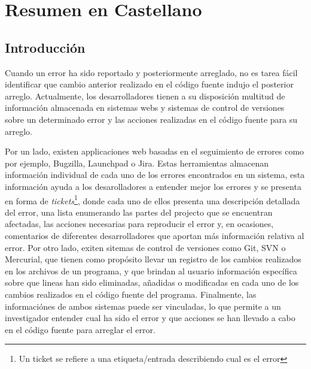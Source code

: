 \documentclass[a4paper, 12pt]{book}
\begin{document}

\cleardoublepage
\chapter{Resumen en Castellano}
\label{app:resumen}
\section{Introducci\'on}

Cuando un error ha sido reportado y posteriormente arreglado, no es tarea f\'acil identificar que cambio anterior realizado en el c\'odigo fuente indujo el posterior arreglo. Actualmente, los desarrolladores tienen a su disposici\'on multitud de informaci\'on almacenada en sistemas webs y sistemas de control de versiones sobre un determinado error y las acciones realizadas en el c\'odigo fuente para su arreglo.

Por un lado, existen applicaciones web basadas en el seguimiento de errores como por ejemplo, Bugzilla, Launchpad o Jira. Estas herramientas almacenan informaci\'on individual de cada uno de los errores encontrados en un sistema, esta informaci\'on ayuda a los desarolladores a entender mejor los errores y se presenta en forma de \emph{tickets}\footnote{Un ticket se refiere a una etiqueta/entrada describiendo cual es el error}, donde cada uno de ellos presenta una descripci\'on detallada del error, una lista enumerando las partes del projecto que se encuentran afectadas, las acciones necesarias para reproducir el error y, en ocasiones, comentarios de diferentes desarrolladores que aportan m\'as informaci\'on relativa al error. Por otro lado, exiten sitemas de control de versiones como Git, SVN o Mercurial, que tienen como prop\'osito llevar un registro de los cambios realizados en los archivos de un programa, y que brindan al usuario informaci\'on espec\'ifica sobre que lineas han sido eliminadas, a\~nadidas o modificadas en cada uno de los cambios realizados en el c\'odigo fuente del programa. Finalmente, las informaci\'ones de ambos sistemas puede ser vinculadas, lo que permite a un investigador entender cual ha sido el error y que acciones se han llevado a cabo en el c\'odigo fuente para arreglar el error.
\end{document}

